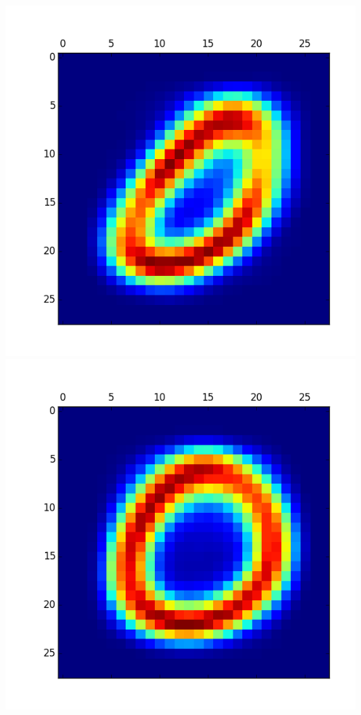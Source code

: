 \documentclass[11pt]{article}
\begin{document}
\begin{itemize}
\includegraphics[scale = 0.5]{10.png}
\includegraphics[scale = 0.5]{11.png}


\end{itemize}
\end{document}
